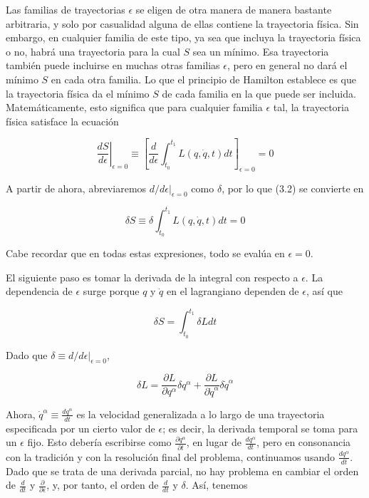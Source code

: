 Las familias de trayectorias $ \epsilon $ se eligen de otra manera de manera bastante arbitraria, y solo por casualidad alguna de ellas contiene la trayectoria física. Sin embargo, en cualquier familia de este tipo, ya sea que incluya la trayectoria física o no, habrá una trayectoria para la cual $ S $ sea un mínimo. Esa trayectoria también puede incluirse en muchas otras familias $ \epsilon $, pero en general no dará el mínimo $ S $ en cada otra familia. Lo que el principio de Hamilton establece es que la trayectoria física da el mínimo $ S $ de cada familia en la que puede ser incluida. Matemáticamente, esto significa que para cualquier familia $ \epsilon $ tal, la trayectoria física satisface la ecuación

\begin{equation*}
\left.\frac{d S}{d \epsilon}\right|_{\epsilon=0} \equiv\left[\frac{d}{d \epsilon} \int_{t_{0}}^{t_{1}} L(q, \dot{q}, t) d t\right]_{\epsilon=0}=0 \tag{3.2}
\end{equation*}


A partir de ahora, abreviaremos $ d /\left.d \epsilon\right|_{\epsilon=0} $ como $ \delta $, por lo que (3.2) se convierte en

\begin{equation*}
\delta S \equiv \delta \int_{t_{0}}^{t_{1}} L(q, \dot{q}, t) d t=0 \tag{3.3}
\end{equation*}


Cabe recordar que en todas estas expresiones, todo se evalúa en $ \epsilon=0 $.

El siguiente paso es tomar la derivada de la integral con respecto a $ \epsilon $. La dependencia de $ \epsilon $ surge porque $ q $ y $ \dot{q} $ en el lagrangiano dependen de $ \epsilon $, así que

\begin{equation*}
\delta S=\int_{t_{0}}^{t_{1}} \delta L d t \tag{3.4}
\end{equation*}


Dado que $ \delta \equiv d /\left.d \epsilon\right|_{\epsilon=0} $,

\begin{equation*}
\delta L=\frac{\partial L}{\partial q^{\alpha}} \delta q^{\alpha}+\frac{\partial L}{\partial \dot{q}^{\alpha}} \delta \dot{q}^{\alpha} \tag{3.5}
\end{equation*}

Ahora, $ \dot{q}^{\alpha} \equiv \frac{d q^{\alpha}}{d t} $ es la velocidad generalizada a lo largo de una trayectoria especificada por un cierto valor de $ \epsilon $; es decir, la derivada temporal se toma para un $ \epsilon $ fijo. Esto debería escribirse como $ \frac{\partial q^{\alpha}}{\partial t} $, en lugar de $ \frac{d q^{\alpha}}{d t} $, pero en consonancia con la tradición y con la resolución final del problema, continuamos usando $ \frac{d q^{\alpha}}{d t} $. Dado que se trata de una derivada parcial, no hay problema en cambiar el orden de $ \frac{d}{d t} $ y $ \frac{\partial}{\partial \epsilon} $, y, por tanto, el orden de $ \frac{d}{d t} $ y $ \delta $. Así, tenemos

